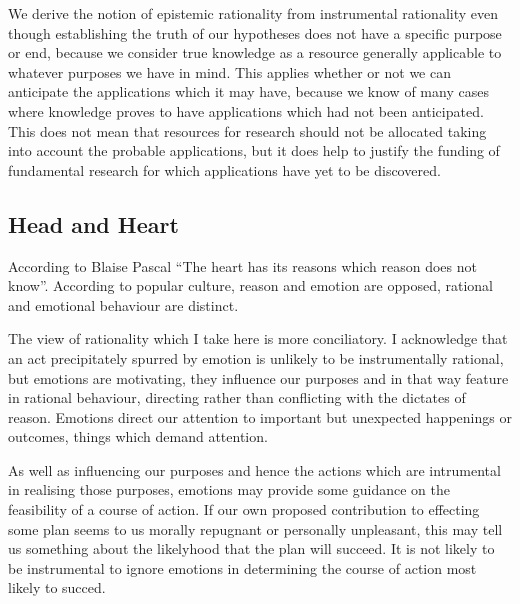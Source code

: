 \documentclass[10pt,titlepage]{book}
\begin{document}
We derive the notion of epistemic rationality from instrumental rationality even though establishing the truth of our hypotheses does not have a specific purpose or end, because we consider true knowledge as a resource generally applicable to whatever purposes we have in mind.
This applies whether or not we can anticipate the applications which it may have, because we know of many cases where knowledge proves to have applications which had not been anticipated.
This does not mean that resources for research should not be allocated taking into account the probable applications, but it does help to justify the funding of fundamental research for which applications have yet to be discovered.

\subsection{Head and Heart}

According to Blaise Pascal ``The heart has its reasons which reason does not know''.
According to popular culture, reason and emotion are opposed, rational and emotional behaviour are distinct.

The view of rationality which I take here is more conciliatory.
I acknowledge that an act precipitately spurred by emotion is unlikely to be instrumentally rational, but emotions are motivating, they influence our purposes and in that way feature in rational behaviour, directing rather than conflicting with the dictates of reason.
Emotions direct our attention to important but unexpected happenings or outcomes, things which demand attention.

As well as influencing our purposes and hence the actions which are intrumental in realising those purposes, emotions may provide some guidance on the feasibility of a course of action.
If our own proposed contribution to effecting some plan seems to us morally repugnant or personally unpleasant, this may tell us something about the likelyhood that the plan will succeed.
It is not likely to be instrumental to ignore emotions in determining the course of action most likely to succed.
\end{document}
